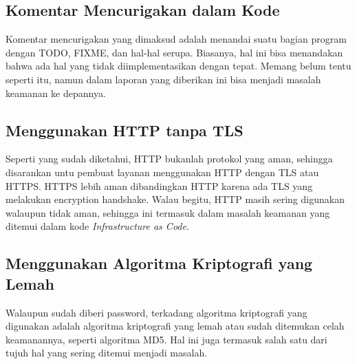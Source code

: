 \subsection{Komentar Mencurigakan dalam Kode}
Komentar mencurigakan yang dimaksud adalah menandai suatu bagian program dengan TODO, FIXME, dan hal-hal serupa. Biasanya, hal ini bisa menandakan bahwa ada hal yang tidak diimplementasikan dengan tepat. Memang belum tentu seperti itu, namun dalam laporan yang diberikan ini bisa menjadi masalah keamanan ke depannya.

\subsection{Menggunakan HTTP tanpa TLS}
Seperti yang sudah diketahui, HTTP bukanlah protokol yang aman, sehingga disarankan untu pembuat layanan menggunakan HTTP dengan TLS atau HTTPS. HTTPS lebih aman dibandingkan HTTP karena ada TLS yang melakukan encryption handshake. Walau begitu, HTTP masih sering digunakan walaupun tidak aman, sehingga ini termasuk dalam masalah keamanan yang ditemui dalam kode \textit{Infrastructure as Code}.

\subsection{Menggunakan Algoritma Kriptografi yang Lemah}
Walaupun sudah diberi password, terkadang algoritma kriptografi yang digunakan adalah algoritma kriptografi yang lemah atau sudah ditemukan celah keamanannya, seperti algoritma MD5. Hal ini juga termasuk salah satu dari tujuh hal yang sering ditemui menjadi masalah.



